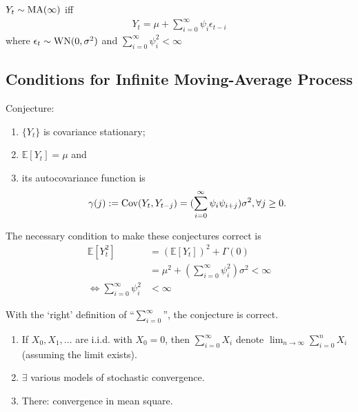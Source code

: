 \documentclass[11pt]{elegantbook}
\begin{document}
\begin{definition}
    $Y_t\sim \textnormal{MA}(\infty)$ iff
        \begin{equation}
            \begin{aligned}
                Y_t=\mu+\sum_{i=0}^{\infty}\psi_i\epsilon_{t-i}
            \end{aligned}
            \nonumber
        \end{equation}
        where $\epsilon_t\sim \textnormal{WN}(0,\sigma^2)$ and \underline{$\sum_{i=0}^{\infty}\psi_i^2<\infty$}
\end{definition}

\subsection{Conditions for Infinite Moving-Average Process}
\begin{note}
    Conjecture:
    \begin{enumerate}
        \item $\{Y_t\}$ is covariance stationary;
        \item $\mathbb{E}[Y_t]=\mu$ and
        \item its autocovariance function is $$\gamma(j):=\textnormal{Cov}(Y_t,Y_{t-j})=(\sum_{i=0}^{\infty}\psi_i\psi_{i+j})\sigma^2,\forall j\geq 0.$$
    \end{enumerate}
\end{note}
The necessary condition to make these conjectures correct is
\begin{equation}
    \begin{aligned}
        \mathbb{E}[Y_t^2]&=(\mathbb{E}[Y_t])^2+\Gamma(0)\\
        &=\mu^2+(\sum_{i=0}^{\infty}\psi_i^2)\sigma^2<\infty\\
        \Leftrightarrow \sum_{i=0}^{\infty}\psi_i^2&<\infty
    \end{aligned}
    \nonumber
\end{equation}
\begin{claim}
    With the `right' definition of ``$\sum_{i=0}^{\infty}$'', the conjecture is correct.
\end{claim}
\begin{remark}
    \begin{enumerate}
        \item If $X_0,X_1,...$ are i.i.d. with $X_0=0$, then $\sum_{i=0}^\infty X_i$ denote $\lim_{n \rightarrow \infty}\sum_{i=0}^n X_i$ (assuming the limit exists).
        \item $\exists$ various models of stochastic convergence.
        \item There: convergence in mean square.
    \end{enumerate}
\end{remark}
\end{document}
